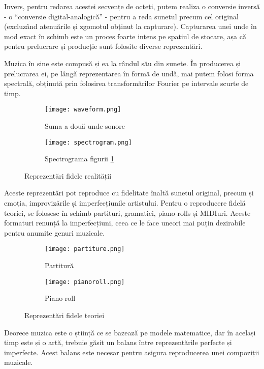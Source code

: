 Invers, pentru redarea acestei secvențe de octeți, putem realiza o conversie inversă - o ``conversie digital-analogică'' - pentru a reda sunetul precum cel original (excluzând atenuările și zgomotul obținut la capturare). Capturarea unei unde în mod exact în schimb este un proces foarte intens pe spațiul de stocare, așa că pentru prelucrare și producție sunt folosite diverse reprezentări.

Muzica în sine este compusă și ea la rândul său din sunete. În producerea și prelucrarea ei, pe lângă reprezentarea în formă de undă, mai putem folosi forma spectrală, obținută prin folosirea transformărilor Fourier pe intervale scurte de timp.

\begin{figure}[H]
    \centering
    \begin{subfigure}{.5\textwidth}
        \centering
        \texttt{[image: waveform.png]}
        \caption{Suma a două unde sonore}
        \label{waveform}
    \end{subfigure}%
    \begin{subfigure}{.5\textwidth}
        \centering
        \texttt{[image: spectrogram.png]}
        \caption{Spectrograma figurii \ref{waveform}}
        \label{spectrogram}
    \end{subfigure}
    \caption{Reprezentări fidele realității}
    \label{reprezentări-fidele-realității}
\end{figure}

Aceste reprezentări pot reproduce cu fidelitate înaltă sunetul original, precum și emoția, improvizările și imperfecțiunile artistului. Pentru o reproducere fidelă teoriei, se folosesc în schimb partituri, gramatici, piano-rolls și MIDIuri. Aceste formaturi renunță la imperfecțiuni, ceea ce le face uneori mai puțin dezirabile pentru anumite genuri muzicale.

\begin{figure}[H]
    \centering
    \begin{subfigure}{.5\textwidth}
        \centering
        \texttt{[image: partiture.png]}
        \caption{Partitură}
        \label{partiture}
    \end{subfigure}%
    \begin{subfigure}{.5\textwidth}
        \centering
        \texttt{[image: pianoroll.png]}
        \caption{Piano roll}
        \label{pianoroll}
    \end{subfigure}
    \caption{Reprezentări fidele teoriei}
    \label{reprezentări-fidele-teoriei}
\end{figure}

Deorece muzica este o știință ce se bazează pe modele matematice, dar în același timp este și o artă, trebuie găsit un balans între reprezentările perfecte și imperfecte. Acest balans este necesar pentru asigura reproducerea unei compoziții muzicale.
